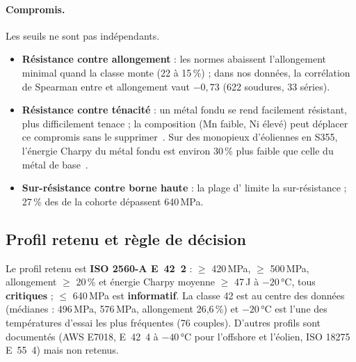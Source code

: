\paragraph{Compromis.} Les seuils ne sont pas indépendants.
\begin{itemize}
  \item \textbf{Résistance contre allongement} : les normes abaissent l'allongement minimal quand la classe monte (22 à 15\,\%) ; dans nos données, la corrélation de Spearman entre \YS{} et allongement vaut $-0{,}73$ (622 soudures, 33 séries).
  \item \textbf{Résistance contre ténacité} : un métal fondu se rend facilement résistant, plus difficilement tenace ; la composition (Mn faible, Ni élevé) peut déplacer ce compromis sans le supprimer~\cite{keehan_2001}. Sur des monopieux d'éoliennes en S355, l'énergie Charpy du métal fondu est environ 30\,\% plus faible que celle du métal de base~\cite{mehmanparast_2018}.
  \item \textbf{Sur-résistance contre borne haute} : la plage d'\UTS{} limite la sur-résistance ; 27\,\% des \UTS{} de la cohorte dépassent 640\,MPa.
\end{itemize}

\subsection{Profil retenu et règle de décision}

\begin{decision}
Le profil retenu est \textbf{ISO 2560-A E~42~2} : \YS{} $\geq$ 420\,MPa,
\UTS{} $\geq$ 500\,MPa, allongement $\geq$ 20\,\% et énergie Charpy moyenne
$\geq$ 47\,J à $-20$\,°C, tous \textbf{critiques} ; \UTS{} $\leq$ 640\,MPa est
\textbf{informatif}. La classe 42 est au centre des données (médianes : \YS{}
496\,MPa, \UTS{} 576\,MPa, allongement 26,6\,\%) et $-20$\,°C est l'une des
températures d'essai les plus fréquentes (76 couples). D'autres profils sont
documentés (AWS E7018, E~42~4 à $-40$\,°C pour l'offshore et l'éolien,
ISO 18275 E~55~4) mais non retenus.
\end{decision}

